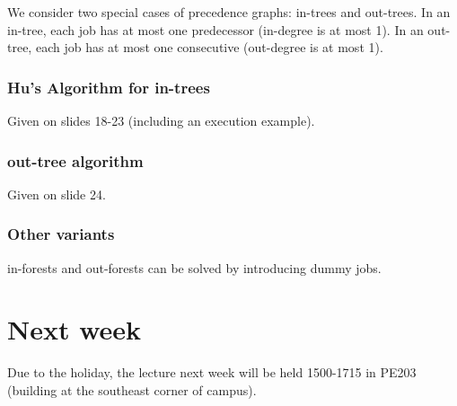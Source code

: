 \documentclass{idc_msc}
\begin{document}
We consider two special cases of precedence graphs: in-trees and out-trees.
In an in-tree, each job has at most one predecessor (in-degree is at most 1).
In an out-tree, each job has at most one consecutive (out-degree is at most 1).

\subsubsection{Hu's Algorithm for in-trees}

Given on slides 18-23 (including an execution example).

\subsubsection{out-tree algorithm}

Given on slide 24.

\subsubsection{Other variants}

in-forests and out-forests can be solved by introducing dummy jobs.

\section{Next week}

Due to the holiday, the lecture next week will be held 1500-1715 in PE203 (building at the southeast corner of campus).
\end{document}
